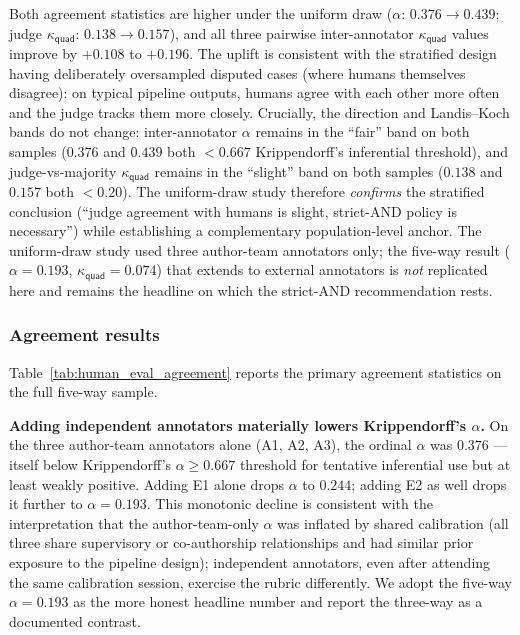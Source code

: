 Both agreement statistics are higher under the uniform draw ($\alpha$: $0.376 \to 0.439$; judge $\kappa_{\textsf{quad}}$: $0.138 \to 0.157$), and all three pairwise inter-annotator $\kappa_{\textsf{quad}}$ values improve by $+0.108$ to $+0.196$. The uplift is consistent with the stratified design having deliberately oversampled disputed cases (where humans themselves disagree): on typical pipeline outputs, humans agree with each other more often and the judge tracks them more closely. Crucially, the direction and Landis--Koch bands do not change: inter-annotator $\alpha$ remains in the ``fair'' band on both samples ($0.376$ and $0.439$ both $< 0.667$ Krippendorff's inferential threshold), and judge-vs-majority $\kappa_{\textsf{quad}}$ remains in the ``slight'' band on both samples ($0.138$ and $0.157$ both $< 0.20$). The uniform-draw study therefore \emph{confirms} the stratified conclusion (``judge agreement with humans is slight, strict-AND policy is necessary'') while establishing a complementary population-level anchor. The uniform-draw study used three author-team annotators only; the five-way result ($\alpha = 0.193$, $\kappa_{\textsf{quad}} = 0.074$) that extends to external annotators is \emph{not} replicated here and remains the headline on which the strict-AND recommendation rests.

\subsubsection{Agreement results}
\label{sec:human_eval_agreement_results}



Table~\ref{tab:human_eval_agreement} reports the primary agreement
statistics on the full five-way sample.

\textbf{Adding independent annotators materially lowers Krippendorff's
$\alpha$.} On the three author-team annotators alone (A1, A2, A3), the
ordinal $\alpha$ was $0.376$ --- itself below Krippendorff's
$\alpha \geq 0.667$ threshold for tentative inferential use but at least
weakly positive. Adding E1 alone drops $\alpha$ to $0.244$; adding E2 as
well drops it further to $\alpha = 0.193$. This monotonic decline is
consistent with the interpretation that the author-team-only $\alpha$
was inflated by shared calibration (all three share supervisory or
co-authorship relationships and had similar prior exposure to the
pipeline design); independent annotators, even after attending the same
calibration session, exercise the rubric differently. We adopt the
five-way $\alpha = 0.193$ as the more honest headline number and report
the three-way as a documented contrast.

